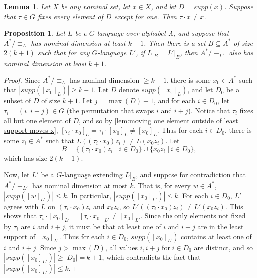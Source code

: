 \documentclass[11pt,a4paper]{amsart}
\newtheorem{lemma}{Lemma}
\newtheorem{proposition}{Proposition}
\theoremstyle{definition}
\newif\ifappendix
\begin{document}
\begin{lemma} \label{lem:moving one element outside of least support moves x}
    Let $X$ be any nominal set, let $x \in X$, and let $D = supp(x)$. 
    Suppose that $\tau \in G$ fixes every element of $D$ except for one. 
    Then $\tau \cdot x \neq x$. 
\end{lemma}

\ifappendix The proof of this lemma is given in Appendix \ref{appendix:proof of moving one element outside of least support moves x}. \fi

\begin{proposition} \label{prop:high nominal dimension of L witnessed by small set}
    Let $L$ be a $G$-language over alphabet $A$, and suppose that $A^* / \equiv_L$ has nominal dimension at least $k+1$. 
    Then there is a set $B \subseteq A^*$ of size $2(k+1)$ such that for any $G$-language $L'$, if $L|_B = L'|_B$, then $A^* / \equiv_{L'}$ also has nominal dimension at least $k+1$. 
\end{proposition}

\begin{proof}
    Since $A^* / \equiv_L$ has nominal dimension $\geq k+1$, there is some $x_0 \in A^*$ such that $|supp([x_0]_L)| \geq k+1$. 
    Let $D$ denote $supp([x_0]_L)$, and let $D_0$ be a subset of $D$ of size $k+1$. 
    Let $j = \max(D)+1$, and for each $i \in D_0$, let $\tau_i = (i \enspace i+j) \in G$ (the permutation that swaps $i$ and $i+j$). 
    Notice that $\tau_i$ fixes all but one element of $D$, and so by \autoref{lem:moving one element outside of least support moves x}, $[\tau_i \cdot x_0]_L = \tau_i \cdot [x_0]_L \neq [x_0]_L$.  
    Thus for each $i \in D_0$, there is some $z_i \in A^*$ such that $L((\tau_i \cdot x_0) z_i) \neq L(x_0 z_i)$. 
    Let
    \[
        B = \{(\tau_i \cdot x_0) z_i \mid i \in D_0\} \cup \{x_0 z_i \mid i \in D_0\},
    \]
    which has size $2(k+1)$.
    
    Now, let $L'$ be a $G$-language extending $L|_B$, and suppose for contradiction that $A^* / \equiv_{L'}$ has nominal dimension at most $k$. 
    That is, for every $w \in A^*$, $|supp([w]_{L'})| \leq k$. 
    In particular, $|supp([x_0]_{L'})| \leq k$.
    For each $i \in D_0$, $L'$ agrees with $L$ on $(\tau_i \cdot x_0) z_i$ and $x_0z_i$, so $L'((\tau_i \cdot x_0) z_i) \neq L'(x_0 z_i)$. 
    This shows that $\tau_i \cdot [x_0]_{L'} = [\tau_i \cdot x_0]_{L'} \neq [x_0]_{L'}$. 
    Since the only elements not fixed by $\tau_i$ are $i$ and $i+j$, it must be that at least one of $i$ and $i+j$ are in the least support of $[x_0]_{L'}$. 
    Thus for each $i \in D_0$, $supp([x_0]_{L'})$ contains at least one of $i$ and $i+j$.
    Since $j > \max(D)$, all values $i, i+j$ for $i \in D_0$ are distinct, and so $|supp([x_0]_{L'})| \geq |D_0| = k+1$, which contradicts the fact that $|supp([x_0]_{L'})| \leq k$.
\end{proof}
\end{document}
